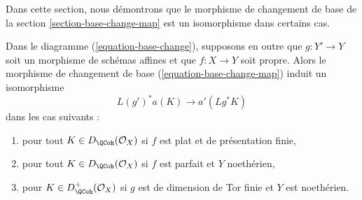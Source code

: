 \noindent
Dans cette section, nous démontrons que le morphisme de changement de base de la
section \ref{section-base-change-map} est un isomorphisme
dans certains cas.

\begin{lemma}
\label{lemma-more-base-change}
Dans le diagramme (\ref{equation-base-change}), supposons en outre que
$g : Y' \to Y$ soit un morphisme de schémas affines et que $f : X \to Y$ soit propre.
Alors le morphisme de changement de base (\ref{equation-base-change-map}) induit un
isomorphisme
$$
L(g')^*a(K) \longrightarrow a'(Lg^*K)
$$
dans les cas suivants :
\begin{enumerate}
\item pour tout $K \in D_\QCoh(\mathcal{O}_X)$ si $f$
est plat et de présentation finie,
\item pour tout $K \in D_\QCoh(\mathcal{O}_X)$ si $f$
est parfait et $Y$ noethérien,
\item pour $K \in D_\QCoh^+(\mathcal{O}_X)$ si $g$ est de dimension de Tor finie
et $Y$ est noethérien.
\end{enumerate}
\end{lemma}


